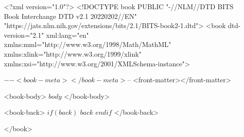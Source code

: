 <?xml version="1.0"?>
<!DOCTYPE book PUBLIC "-//NLM//DTD BITS Book Interchange DTD v2.1 20220202//EN" "https://jats.nlm.nih.gov/extensions/bits/2.1/BITS-book2-1.dtd">
<book
dtd-version="2.1" xml:lang="en" 
xmlns:mml="http://www.w3.org/1998/Math/MathML" 
xmlns:xlink="http://www.w3.org/1999/xlink" 
xmlns:xsi="http://www.w3.org/2001/XMLSchema-instance">

$-- <book-meta></book-meta>
$-- <front-matter></front-matter>

<book-body>
$body$
</book-body>

<book-back>
$if(back)$
$back$
$endif$
</book-back>

</book>